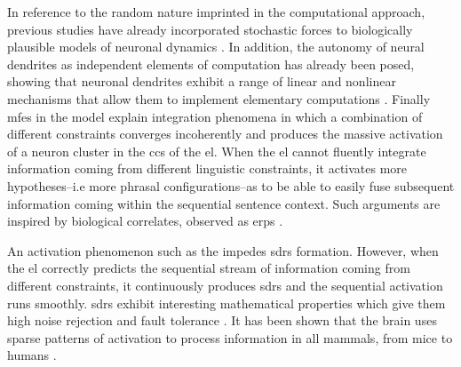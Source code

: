 {In reference to the random nature imprinted in the computational approach, previous studies have already incorporated stochastic forces to biologically plausible models of neuronal dynamics \cite{harrison_l.m_stochastic_2005}. In addition, the autonomy of neural dendrites as independent elements of computation has already been posed, showing that neuronal dendrites exhibit a range of linear and nonlinear mechanisms that allow them to implement elementary computations \cite{poirazi_dendritic_2015, PAYEUR201978}. Finally \glspl{mfe} in the model explain integration phenomena in which a combination of different constraints converges incoherently and produces the massive activation of a neuron cluster in the \glspl{cc} of the \gls{el}. When the \gls{el} cannot fluently integrate information coming from different linguistic constraints, it activates more hypotheses--i.e more phrasal configurations--as to be able to easily fuse subsequent information coming within the sequential sentence context. Such arguments are inspired by biological correlates, observed as \gls{erps} \cite{Hagoort2003InterplayBS}.

An activation phenomenon such as the  impedes \glspl{sdr} formation. However, when the \gls{el} correctly predicts the sequential stream of information coming from different constraints, it continuously produces \glspl{sdr} and the sequential activation runs smoothly. \glspl{sdr} exhibit interesting mathematical properties which give them high noise rejection and fault tolerance \cite{DBLP:journals/corr/AhmadH15}. It has been shown that the brain uses sparse patterns of activation to process information in all mammals, from mice to humans \cite{barth_experimental_2012}.
}






